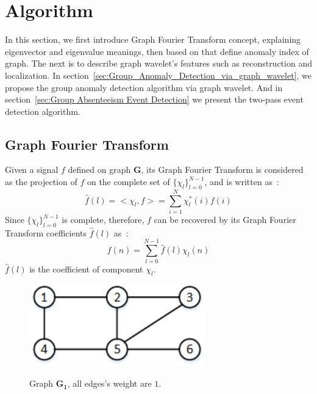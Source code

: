 \section{Algorithm}
\label{sec:algorithm}

In this section, we first introduce Graph Fourier Transform concept, explaining eigenvector and eigenvalue meanings, then based on that define anomaly index of graph. The next is to describe graph wavelet's features such as reconstruction and localization. In section~\ref{sec:Group_Anomaly_Detection_via_graph_wavelet}, we propose the group anomaly detection algorithm via graph wavelet. And in section~\ref{sec:Group Absenteeism Event Detection} we present the two-pass event detection algorithm.

\subsection{Graph Fourier Transform}
\label{sec:Graph_Fourier_Transform}
Given a signal $f$ defined on graph $\mathbf{G}$, its Graph Fourier Transform is considered as the projection of $f$ on the complete set of $\{\chi_l\}_{l=0}^{N-1}$, and is written as~\cite{hammond2011wavelets}:
\begin{equation}
\label{eq:Graph_Fourier_Transform1}
\hat{f}(l)=<\chi_{l},f>=\sum_{i=1}^{N}\chi^*_{l}(i)f(i)
\end{equation}
Since $\{\chi_l\}_{l=0}^{N-1}$ is complete, therefore, $f$ can be recovered by its Graph Fourier Transform coefficients $\hat{f}(l)$ as~\cite{hammond2011wavelets}:
\begin{equation}
\label{eq:Inverser_Graph_Fourier_Transform}
f(n)=\sum_{l=0}^{N-1}\hat{f}(l)\chi_{l}(n)
\end{equation}
$\hat{f}(l)$ is the coefficient of component $\chi_l$.


\begin{figure}[h]
	\centering
    {
		\includegraphics[height=1.4in] {figures/graph_G.png}
	}
	\caption{Graph $\mathbf{G_1}$, all edges's weight are $1$.}
	\label{fig:graph_G}
\end{figure}


